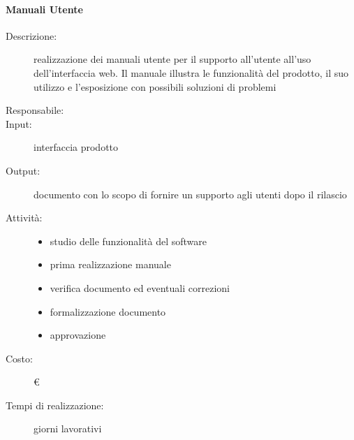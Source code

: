 \paragraph{Manuali Utente}
\begin{description}
\item[Descrizione:] realizzazione dei manuali utente per il supporto all’utente all'uso dell'interfaccia web. Il manuale illustra le funzionalità del prodotto, il suo utilizzo e l’esposizione con possibili soluzioni di problemi 

\item[Responsabile:] 

\item[Input:] interfaccia prodotto 

\item[Output:] documento con lo scopo di fornire un supporto agli utenti dopo il rilascio

\item[Attività:]
\begin{itemize}
\item studio delle funzionalità del software
\item prima realizzazione manuale
\item verifica documento ed eventuali correzioni
\item formalizzazione documento
\item approvazione
\end{itemize}
\item[Costo:] \euro 
\item[Tempi di realizzazione:]  giorni lavorativi
\end{description}




